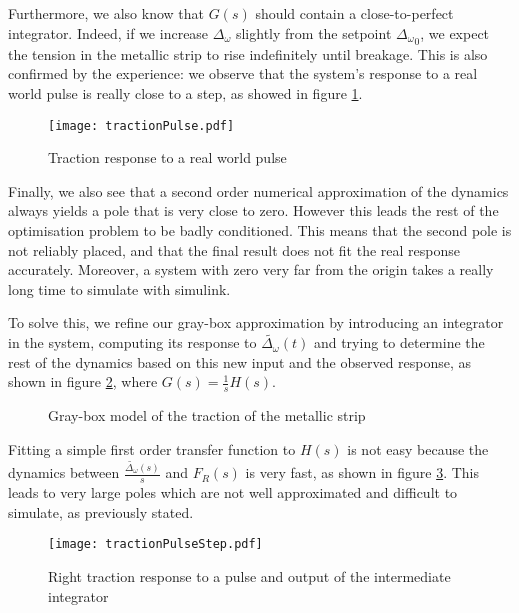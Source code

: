 Furthermore, we also know that $G(s)$ should contain a close-to-perfect integrator. Indeed, if we increase $\Delta_\omega$ slightly from the setpoint ${\Delta_\omega}_0$, we expect the tension in the metallic strip to rise indefinitely until breakage. This is also confirmed by the experience: we observe that the system's response to a real world pulse is really close to a step, as showed in figure \ref{fig:tracImpulseResponse}.
\begin{figure}[htbp]
\centering
\texttt{[image: tractionPulse.pdf]}
\caption{Traction response to a real world pulse\label{fig:tracImpulseResponse}}
\end{figure}
Finally, we also see that a second order numerical approximation of the dynamics always yields a pole that is very close to zero. However this leads the rest of the optimisation problem to be badly conditioned. This means that the second pole is not reliably placed, and that the final result does not fit the real response accurately. Moreover, a system with zero very far from the origin takes a really long time to simulate with simulink.

To solve this, we refine our gray-box approximation by introducing an integrator in the system, computing its response to $\tilde{\Delta_\omega}(t)$ and trying to determine the rest of the dynamics based on this new input and the observed response, as shown in figure \ref{fig:tractionGrayBox}, where $G(s) = \frac{1}{s}H(s)$.
\begin{figure}[htbp]
\centering
{}
\caption{\label{fig:tractionInput}Gray-box model of the traction of the metallic strip\label{fig:tractionGrayBox}}
\end{figure}

Fitting a simple first order transfer function to $H(s)$ is not easy because the dynamics between $\frac{\tilde{\Delta_\omega}(s)}{s}$ and $F_R(s)$ is very fast, as shown in figure \ref{fig:tractionPulseStep}. This leads to very large poles which are not well approximated and difficult to simulate, as previously stated.
\begin{figure}[htbp]
\centering
\texttt{[image: tractionPulseStep.pdf]}
\caption{Right traction response to a pulse and output of the intermediate integrator\label{fig:tractionPulseStep}}
\end{figure}


